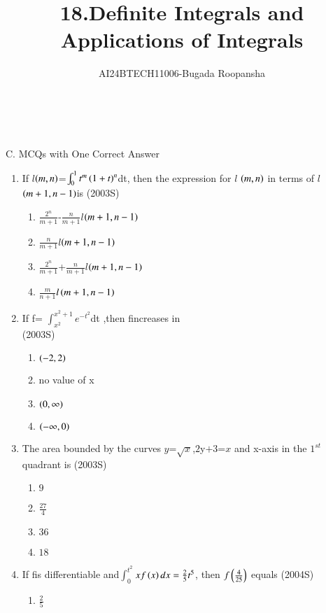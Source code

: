 \documentclass[journal,12pt,twocolumn]{IEEEtran}
\theoremstyle{remark}
\begin{document}

\vspace{3cm}

\title{18.Definite Integrals and Applications of Integrals}
\author{AI24BTECH11006-Bugada Roopansha}

\\\\{C. MCQs with One Correct Answer}    
\begin{enumerate}[start=21]
\item If $l$$\left(m,n\right)$=$\int_{0}^{1}t^m\left(1+t\right)^n$dt, then the expression for $l$ $\left(m,n\right)$ in terms of $l$$\left(m+1,n-1\right)$is
\hfill{(2003S)}
\begin{enumerate}
\item $\frac{2^n}{m+1}$-$\frac{n}{m+1}$$l$$\left(m+1,n-1\right)$
\item $\frac{n}{m+1}$$l$$\left(m+1,n-1\right)$
\item $\frac{2^n}{m+1}$+$\frac{n}{m+1}$$l$$\left(m+1,n-1\right)$
\item $\frac{m}{n+1}$$l\left(m+1,n-1\right)$
\end{enumerate}
\item If f= $\int_{x^2}^{x^2+1}e^{-t^2}$dt ,then fincreases in\\
\hfill{(2003S)}
\begin{enumerate}
\item  $\left(-2,2\right)$
\item no value of x
\item  $\left(0,\infty\right)$
\item  $\left(-\infty,0\right)$
\end{enumerate}
\item The area bounded by the curves  $y$=$\sqrt{x}$,$2$y$+3$=$x$ and x-axis in the $1^{st}$quadrant is
\hfill{(2003S)}
\begin{enumerate}
\item $9$
\item$\frac{27}{4}$
\item $36$
\item $18$
\end{enumerate}
\item If fis differentiable and$\int_{0}^{t^2}$$xf\left(x\right)dx=\frac{2}{5}t^5$, then $f\left(\frac{4}{25}\right)$ equals
\hfill{(2004S)}
\begin{enumerate}
\item $\frac{2}{5}$

\end{enumerate}$$
\end{enumerate}
\end{document}
